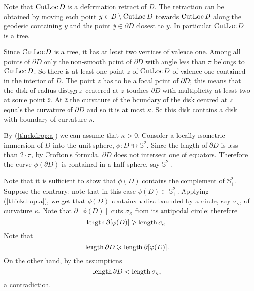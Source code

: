 \documentclass[oneside,a4paper]{article}
\begin{document}
Note that $\mathop{\rm CutLoc}\nolimits D$ is a
deformation retract of $D$.
The retraction can be obtained by moving each point $y\in D\setminus \mathop{\rm CutLoc}\nolimits D$ towards $\mathop{\rm CutLoc}\nolimits D$
along the geodesic containing $y$ and
the point $\bar y\in\partial D$ closest to $y$.
In particular $\mathop{\rm CutLoc}\nolimits D$ is a tree.


Since $\mathop{\rm CutLoc}\nolimits D$  is a tree, it has
at least two vertices of valence one.
Among all points of $\partial D$ only
the non-smooth point of $\partial D$ with angle less
than $\pi$ belongs to $\mathop{\rm CutLoc}\nolimits D$.
So there is at least one point $z$
of $\mathop{\rm CutLoc}\nolimits D$ of valence one
contained in the interior of $D$.
The point $z$ has to be a focal point of $\partial D$;
this means that
the disk of radius $\mathop{\rm dist}\nolimits_{\partial D}z$ centered at $z$ touches $\partial D$
with multiplicity at least two at some point $\bar z$.
At $\bar z$ the curvature of
the boundary of the disk centred at $z$ equals the curvature of
$\partial D$  and so it is at most $\kappa$. 
So this disk contains a disk with boundary of curvature $\kappa$.

By (\ref{thickdrop:a}) we can assume that $\kappa>0$.
Consider a locally isometric
immersion  of $D$ into the unit sphere, $\phi: D\looparrowright \mathbb{S}^2$.
Since the length of $\partial D$ is less than
$2{\cdot}\pi$, by Crofton's formula,  $\partial D$
does not intersect one of equators.
Therefore the curve $\phi(\partial D)$ is contained in a half-sphere, say $\mathbb{S}^2_+$.

Note that
it is sufficient to show that $\phi(D)$ contains the complement of $\mathbb{S}^2_+$.
Suppose the contrary; note that in this case $\phi(D)\subset \mathbb{S}^2_+$.
Applying (\ref{thickdrop:a}),
we get that $\phi(D)$ contains a disc bounded by a circle,
say $\sigma_\kappa$, of curvature $\kappa$.
Note that $\partial[\phi(D)]$ cuts $\sigma_\kappa$ from its antipodal circle;
therefore
$$\mathop{\rm length}\nolimits \partial[\varphi(D)]\geqslant \mathop{\rm length}\nolimits \sigma_\kappa.$$
Note that
$$\mathop{\rm length}\nolimits\partial D\geqslant \mathop{\rm length}\nolimits \partial[\varphi(D)].$$
On the other hand, by the assumptions
$$\mathop{\rm length}\nolimits\partial D<\mathop{\rm length}\nolimits \sigma_\kappa,$$
a contradiction.
\qeds
\end{document}
